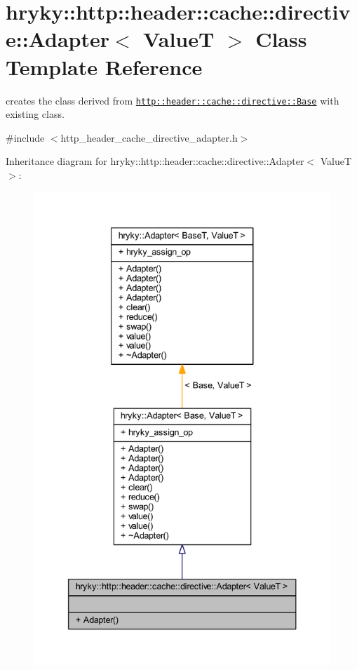 \hypertarget{classhryky_1_1http_1_1header_1_1cache_1_1directive_1_1_adapter}{\section{hryky\-:\-:http\-:\-:header\-:\-:cache\-:\-:directive\-:\-:Adapter$<$ Value\-T $>$ Class Template Reference}
\label{classhryky_1_1http_1_1header_1_1cache_1_1directive_1_1_adapter}
}


creates the class derived from \href{http::header::cache::directive::Base}{\tt http\-::header\-::cache\-::directive\-::\-Base} with existing class.  




{\ttfamily \#include $<$http\-\_\-header\-\_\-cache\-\_\-directive\-\_\-adapter.\-h$>$}



Inheritance diagram for hryky\-:\-:http\-:\-:header\-:\-:cache\-:\-:directive\-:\-:Adapter$<$ Value\-T $>$\-:
\nopagebreak
\begin{figure}[H]
\begin{center}
\leavevmode
\includegraphics[width=340pt]{classhryky_1_1http_1_1header_1_1cache_1_1directive_1_1_adapter__inherit__graph}
\end{center}
\end{figure}
